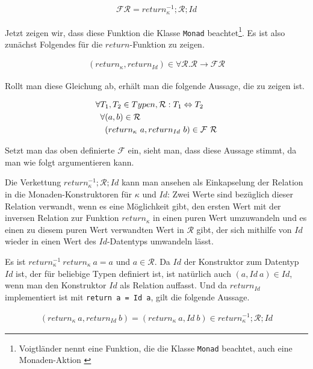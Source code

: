 \begin{align*}
\mathcal{F} \mathcal{R} = return_{\kappa}^{-1} ; \mathcal{R} ; Id
\end{align*}

Jetzt zeigen wir, dass diese Funktion die Klasse \texttt{Monad} beachtet\footnote{Voigtländer nennt eine Funktion, die die Klasse \texttt{Monad} beachtet, auch eine Monaden-Aktion \cite{voigtlander}}. Es ist also zunächst Folgendes für die $return$-Funktion zu zeigen.

\begin{align*}
(return_{\kappa}, return_{Id}) \in \forall \mathcal{R}. \mathcal{R} \rightarrow \mathcal{F} \mathcal{R}
\end{align*}

Rollt man diese Gleichung ab, erhält man die folgende Aussage, die zu zeigen ist.

\begin{align*}
& \forall T_1, T_2 \in Typen, \mathcal{R} : T_1 \Leftrightarrow T_2 \\
& \hphantom{\forall} \forall (a, b) \in \mathcal{R} \\
& \hphantom{\forall \forall} (return_{\kappa}\ a, return_{Id}\ b) \in \mathcal{F}\ \mathcal{R}
\end{align*}

Setzt man das oben definierte $\mathcal{F}$ ein, sieht man, dass diese Aussage stimmt, da man wie folgt argumentieren kann.

Die Verkettung $return_{\kappa}^{-1} ; \mathcal{R} ; Id$ kann man ansehen als Einkapselung der Relation in die 
Monaden-Konstruktoren für $\kappa$ und $Id$: Zwei Werte sind bezüglich dieser Relation verwandt, wenn es
eine Möglichkeit gibt, den ersten Wert mit der inversen Relation zur Funktion $return_{\kappa}$ in einen puren Wert
umzuwandeln und es einen zu diesem puren Wert verwandten Wert in $\mathcal{R}$ gibt, der sich mithilfe von $Id$ wieder
in einen Wert des $Id$-Datentyps umwandeln lässt.

Es ist $return_{\kappa}^{-1}\ return_{\kappa}\ a = a$ und $a \in \mathcal{R}$. Da $Id$ der Konstruktor zum Datentyp $Id$
ist, der für beliebige Typen definiert ist, ist natürlich auch $(a, Id\ a) \in Id$, wenn man den Konstruktor $Id$ als Relation auffasst.
Und da $return_{Id}$ implementiert ist mit \texttt{return a = Id a}, gilt die folgende Aussage.

\begin{align*}
(return_{\kappa}\ a, return_{Id}\ b) = (return_{\kappa}\ a, Id\ b) \in return_{\kappa}^{-1} ; \mathcal{R} ; Id
\end{align*}

